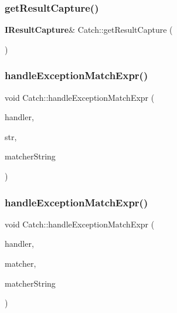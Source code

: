 \subsubsection{getResultCapture()}
{\footnotesize\ttfamily \textbf{ I\+Result\+Capture}\& Catch\+::get\+Result\+Capture (\begin{DoxyParamCaption}{ }\end{DoxyParamCaption})}

\mbox{\label{namespace_catch_aea6f8ff3b3838829d4a61694e4bc41ca}} 
\subsubsection{handleExceptionMatchExpr()\hspace{0.1cm}{\footnotesize\ttfamily [1/2]}}
{\footnotesize\ttfamily void Catch\+::handle\+Exception\+Match\+Expr (\begin{DoxyParamCaption}\item[{\textbf{ Assertion\+Handler} \&}]{handler,  }\item[{std\+::string const \&}]{str,  }\item[{\textbf{ String\+Ref} const \&}]{matcher\+String }\end{DoxyParamCaption})}

\mbox{\label{namespace_catch_a3a96a82307107087642e22fc4be5844d}} 
\subsubsection{handleExceptionMatchExpr()\hspace{0.1cm}{\footnotesize\ttfamily [2/2]}}
{\footnotesize\ttfamily void Catch\+::handle\+Exception\+Match\+Expr (\begin{DoxyParamCaption}\item[{\textbf{ Assertion\+Handler} \&}]{handler,  }\item[{\textbf{ String\+Matcher} const \&}]{matcher,  }\item[{\textbf{ String\+Ref} const \&}]{matcher\+String }\end{DoxyParamCaption})}

\mbox{\label{namespace_catch_a65af25091f2ab61056e166765963e525}} 
